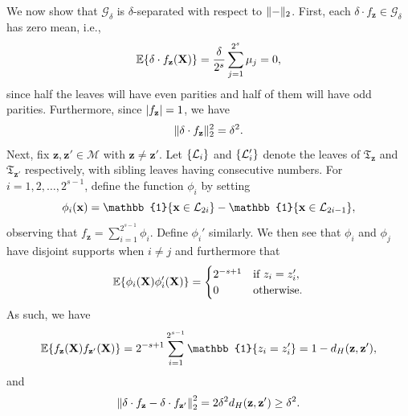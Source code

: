 \documentclass[11pt]{article}
\newcommand{\bx}{\mathbf{x}}
\newcommand{\bz}{\mathbf{z}}
\newcommand{\bX}{\mathbf{X}}
\DeclarePairedDelimiter{\braces}{\lbrace}{\rbrace}
\DeclarePairedDelimiter{\abs}{|}{|}
\DeclarePairedDelimiter{\norm}{\|}{\|}
\newcommand{\E}{\mathbb{E}}
\newcommand{\indicator}{\mathbb{1}}
\newcommand{\tree}{\mathfrak{T}}
\newcommand{\leaf}{\mathcal{L}}
\begin{document}
    We now show that $\mathcal{G}_\delta$ is $\delta$-separated with respect to $\norm{-}_2$.
    First, each $\delta \cdot f_{\bz} \in \mathcal{G}_\delta$ has zero mean, i.e.,
    \begin{equation}
        \E \braces*{\delta \cdot f_{\bz}(\bX)} = \frac{\delta}{2^s}\sum_{j=1}^{2^s} \mu_j = 0,
    \end{equation}
    since half the leaves will have even parities and half of them will have odd parities.
    Furthermore, since $\abs{f_{\bz}} = 1$, we have
    \begin{equation}
        \norm{\delta \cdot f_{\bz}}_2^2 = \delta^2.
    \end{equation}
    Next, fix $\bz, \bz' \in \mathcal{M}$ with $\bz \neq \bz'$.
    Let $\braces*{\leaf_i}$ and $\braces*{\leaf_i'}$ denote the leaves of $\tree_{\bz}$ and $\tree_{\bz'}$ respectively, with sibling leaves having consecutive numbers.
    For $i=1,2,\ldots,2^{s-1}$, define the function $\phi_i$ by setting 
    \begin{equation}
        \phi_i(\bx) = \indicator\braces*{\bx \in \leaf_{2i}} - \indicator\braces*{\bx \in \leaf_{2i-1}},
    \end{equation}
    observing that $f_\bz = \sum_{i=1}^{2^{s-1}} \phi_i$.
    Define $\phi_i'$ similarly.
    We then see that $\phi_i$ and $\phi_j$ have disjoint supports when $i \neq j$ and furthermore that 
    \begin{equation}
        \E\braces*{\phi_i(\bX)\phi_i'(\bX)} = \begin{cases}
            2^{-s+1} & \text{if}~z_i = z_i', \\
            0 & \text{otherwise}.
        \end{cases}
    \end{equation}
    As such, we have
    \begin{equation}
        \E\braces*{f_{\bz}(\bX)f_{\bz'}(\bX)} = 2^{-s+1}\sum_{i=1}^{2^{s-1}} \indicator\braces*{z_i = z_i'} = 1 - d_H(\bz,\bz'),
    \end{equation}
    and
    \begin{equation}
        \norm*{\delta \cdot f_{\bz} - \delta \cdot f_{\bz'}}_2^2 = 2\delta^2 d_H(\bz,\bz') \geq \delta^2.
    \end{equation}
\end{document}
